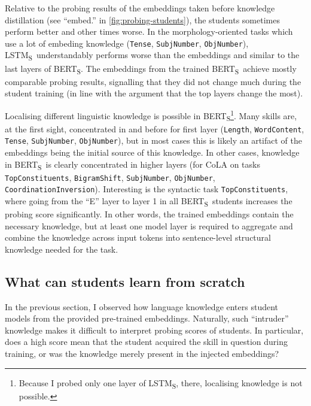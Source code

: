 \documentclass[bsc,frontabs,singlespacing,parskip,deptreport]{infthesis}
\def\BERTS{BERT\textsubscript{S}}
\def\LSTMS{LSTM\textsubscript{S}}
\begin{document}
{{{      %
      Relative to the probing results of the embeddings taken before knowledge distillation (see ``embed.'' in \autoref{fig:probing-students}), the students sometimes perform better and other times worse. In the morphology-oriented tasks which use a lot of embeding knowledge (\verb|Tense|, \verb|SubjNumber|, \verb|ObjNumber|), \LSTMS~understandably performs worse than the embeddings and similar to the last layers of \BERTS. The embeddings from the trained \BERTS~achieve mostly comparable probing results, signalling that they did not change much during the student training (in line with the argument that the top layers change the most).
      
      Localising different linguistic knowledge is possible in \BERTS\footnote{Because I probed only one layer of \LSTMS, there, localising knowledge is not possible.}. Many skills are, at the first sight, concentrated in and before for first layer (\verb|Length|, \verb|WordContent|, \verb|Tense|, \verb|SubjNumber|, \verb|ObjNumber|), but in most cases this is likely an artifact of the embeddings being the initial source of this knowledge. In other cases, knowledge in \BERTS~is clearly concentrated in higher layers (for CoLA on tasks \verb|TopConstituents|, \verb|BigramShift|, \verb|SubjNumber|, \verb|ObjNumber|, \verb|CoordinationInversion|). Interesting is the syntactic task \verb|TopConstituents|, where going from the ``E'' layer to layer 1 in all \BERTS~students increases the probing score significantly. In other words, the trained embeddings contain the necessary knowledge, but at least one model layer is required to aggregate and combine the knowledge across input tokens into sentence-level structural knowledge needed for the task.
    }

    \subsection{What can students learn from scratch}{
      In the previous section, I observed how language knowledge enters student models from the provided pre-trained embeddings. Naturally, such ``intruder'' knowledge makes it difficult to interpret probing scores of students. In particular, does a high score mean that the student acquired the skill in question during training, or was the knowledge merely present in the injected embeddings?

}}}
\end{document}
